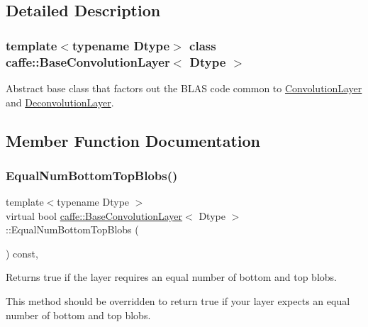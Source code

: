 \subsection{Detailed Description}
\subsubsection*{template$<$typename Dtype$>$\newline
class caffe\+::\+Base\+Convolution\+Layer$<$ Dtype $>$}

Abstract base class that factors out the B\+L\+AS code common to \mbox{\hyperlink{classcaffe_1_1_convolution_layer}{Convolution\+Layer}} and \mbox{\hyperlink{classcaffe_1_1_deconvolution_layer}{Deconvolution\+Layer}}. 

\subsection{Member Function Documentation}
\mbox{\label{classcaffe_1_1_base_convolution_layer_ad8e839460bf52abe3df2008b99a1810d}} 
\subsubsection{\texorpdfstring{Equal\+Num\+Bottom\+Top\+Blobs()}{EqualNumBottomTopBlobs()}\hspace{0.1cm}{\footnotesize\ttfamily [1/2]}}
{\footnotesize\ttfamily template$<$typename Dtype $>$ \\
virtual bool \mbox{\hyperlink{classcaffe_1_1_base_convolution_layer}{caffe\+::\+Base\+Convolution\+Layer}}$<$ Dtype $>$\+::Equal\+Num\+Bottom\+Top\+Blobs (\begin{DoxyParamCaption}{ }\end{DoxyParamCaption}) const\hspace{0.3cm}{\ttfamily [inline]}, {\ttfamily [virtual]}}



Returns true if the layer requires an equal number of bottom and top blobs. 

This method should be overridden to return true if your layer expects an equal number of bottom and top blobs. 

